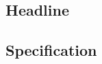 %
%
%

\subsection{Headline}\label{sec:import_leakage:headline}

%
%

\subsection{Specification}\label{sec:import_leakage:spec}

%
%

